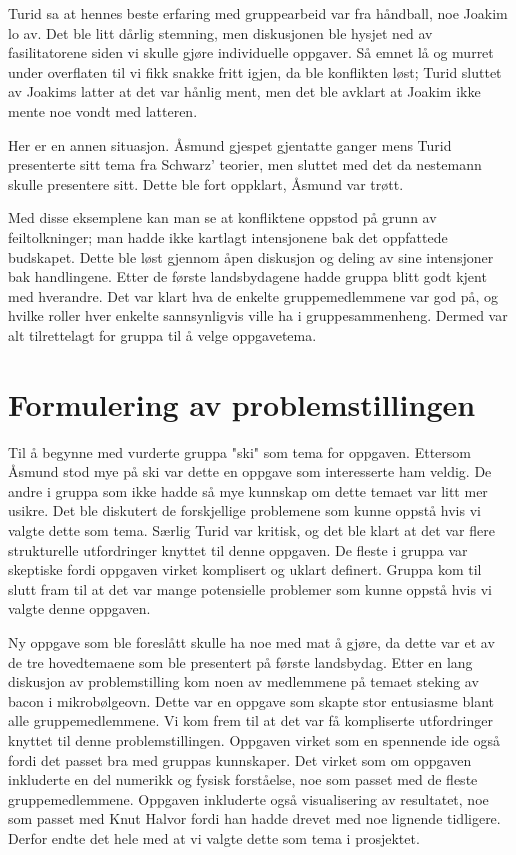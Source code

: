 Turid sa at hennes beste erfaring med gruppearbeid var fra håndball, noe Joakim
lo av. Det ble litt dårlig stemning, men diskusjonen ble hysjet ned av
fasilitatorene siden vi skulle gjøre individuelle oppgaver. Så emnet lå og
murret under overflaten til vi fikk snakke fritt igjen, da ble konflikten løst;
Turid sluttet av Joakims latter at det var hånlig ment, men det ble avklart at
Joakim ikke mente noe vondt med latteren.

Her er en annen situasjon. Åsmund gjespet gjentatte ganger mens Turid
presenterte sitt tema fra Schwarz’ teorier, men sluttet med det da nestemann
skulle presentere sitt.  Dette ble fort oppklart, Åsmund var trøtt.

Med disse eksemplene kan man se at konfliktene oppstod på grunn av
feiltolkninger; man hadde ikke kartlagt intensjonene bak det oppfattede
budskapet. Dette ble løst gjennom åpen diskusjon og deling av sine intensjoner
bak handlingene.  Etter de første landsbydagene hadde gruppa blitt godt kjent
med hverandre. Det var klart hva de enkelte gruppemedlemmene var god på, og
hvilke roller hver enkelte sannsynligvis ville ha i gruppesammenheng. Dermed var
alt tilrettelagt for gruppa til å velge oppgavetema.

\section{Formulering av problemstillingen}

Til å begynne med vurderte gruppa "ski" som tema for oppgaven. Ettersom Åsmund
stod mye på ski var dette en oppgave som interesserte ham veldig. De andre i
gruppa som ikke hadde så mye kunnskap om dette temaet var litt mer usikre. Det
ble diskutert de forskjellige problemene som kunne oppstå hvis vi valgte dette
som tema. Særlig Turid var kritisk, og det ble klart at det var flere
strukturelle utfordringer knyttet til denne oppgaven. De fleste i gruppa var
skeptiske fordi oppgaven virket komplisert og uklart definert. Gruppa kom til
slutt fram til at det var mange potensielle problemer som kunne oppstå hvis vi
valgte denne oppgaven.

Ny oppgave som ble foreslått skulle ha noe med mat å gjøre, da dette var et av
de tre hovedtemaene som ble presentert på første landsbydag. Etter en lang
diskusjon av problemstilling kom noen av medlemmene på temaet steking av bacon i
mikrobølgeovn. Dette var en oppgave som skapte stor entusiasme blant alle
gruppemedlemmene. Vi kom frem til at det var få kompliserte utfordringer knyttet
til denne problemstillingen. Oppgaven virket som en spennende ide også fordi det
passet bra med gruppas kunnskaper. Det virket som om oppgaven inkluderte en del
numerikk og fysisk forståelse, noe som passet med de fleste gruppemedlemmene.
Oppgaven inkluderte også visualisering av resultatet, noe som passet med Knut
Halvor fordi han hadde drevet med noe lignende tidligere. Derfor endte det hele
med at vi valgte dette som tema i prosjektet.

